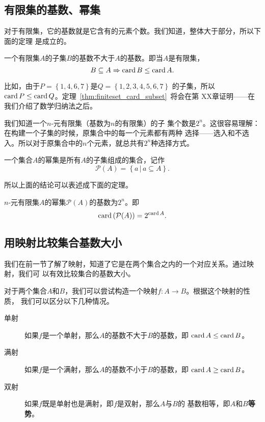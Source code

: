 \subsection{有限集的基数、幂集}

对于有限集，它的基数就是它含有的元素个数。我们知道，整体大于部分，所以下面的定理
是成立的。

\begin{rawthm}\label{thm:finiteset_card_subset}
    一个有限集$A$的子集$B$的基数不大于$A$的基数。即当$A$是有限集，
    \[
        B \subseteq A \Rightarrow \operatorname{card} B \le \operatorname{card} A.
    \]
\end{rawthm}

比如，由于$P = \left\{ 1,4,6,7 \right\} $是$Q = \left\{ 1,2,3,4,5,6,7 \right\} $
的子集，所以$\operatorname{card} P \le \operatorname{card} Q$。定理~\ref{thm:finiteset_card_subset}~将会在第
XX章证明——在我们介绍了数学归纳法之后。%

我们知道一个$n$-元有限集（基数为$n$的有限集）的子
集个数是$2^n$。这很容易理解：在构建一个子集的时候，原集合中的每一个元素都有两种
选择——选入和不选入。所以对于原集合中的$n$个元素，就总共有$2^n$种选择方式。

\begin{rawdef}[幂集]
    一个集合$A$的幂集是所有$A$的子集组成的集合，记作
    \[
        \mathcal{P}(A) = \left\{ a\,|\, a\subseteq A \right\} .
    \]
\end{rawdef}

所以上面的结论可以表述成下面的定理。

\begin{rawthm}
    $n$-元有限集$A$的幂集$\mathcal{P}(A)$的基数为$2^n$。即
    \[
        \operatorname{card} \left( \mathcal{P}(A) \right) = 2^{\operatorname{card} A}.
    \]
\end{rawthm}

\subsection{用映射比较集合基数大小}

我们在前一节了解了映射，知道了它是在两个集合之内的一个对应关系。通过映射，我们可
以有效比较集合的基数大小。

对于两个集合$A$和$B$，我们可以尝试构造一个映射$f: A \to B$。根据这个映射的性质，
我们可以区分以下几种情况。

\begin{description}
    \item[单射] 如果$f$是一个单射，那么$A$的基数不大于$B$的基数，即
        $\operatorname{card} A \le \operatorname{card} B$。

    \item[满射] 如果$f$是一个满射，那么$A$的基数不小于$B$的基数，即
        $\operatorname{card} A \ge \operatorname{card} B$。

    \item[双射] 如果$f$既是单射也是满射，即$f$是双射，那么$A$与$B$的
        基数相等，即$A$和$B$\textbf{等势}。
\end{description}

